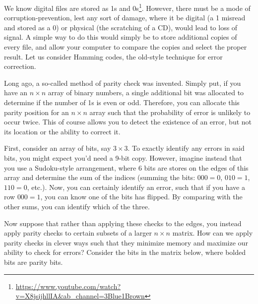 We know digital files are stored as 1s and 0s\footnote{\url{https://www.youtube.com/watch?v=X8jsijhllIA&ab_channel=3Blue1Brown}}. However, there must be a mode of corruption-prevention, lest any sort of damage, where it be digital (a 1 misread and stored as a 0) or physical (the scratching of a CD), would lead to loss of signal. A simple way to do this would simply be to store additional copies of every file, and allow your computer to compare the copies and select the proper result. Let us consider Hamming codes, the old-style technique for error correction.\newline

Long ago, a so-called method of parity check was invented. Simply put, if you have an $n \times n$ array of binary numbers, a single additional bit was allocated to determine if the number of 1s is even or odd. Therefore, you can allocate this parity position for an $n \times n$ array such that the probability of error is unlikely to occur twice. This of course allows you to detect the existence of an error, but not its location or the ability to correct it.\newline

First, consider an array of bits, say $3\times 3$. To exactly identify any errors in said bits, you might expect you'd need a 9-bit copy. However, imagine instead that you use a Sudoku-style arrangement, where 6 bits are stores on the edges of this array and determine the sum of the indices (summing the bits: $000 = 0$, $010 = 1$, $110 = 0$, etc.). Now, you can certainly identify an error, such that if you have a row $000 = 1$, you can know one of the bits has flipped. By comparing with the other sums, you can identify which of the three.\newline

Now suppose that rather than applying these checks to the edges, you instead apply parity checks to certain subsets of a larger $n \times n$ matrix. How can we apply parity checks in clever ways such that they minimize memory and maximize our ability to check for errors? Consider the bits in the matrix below, where bolded bits are parity bits. 

